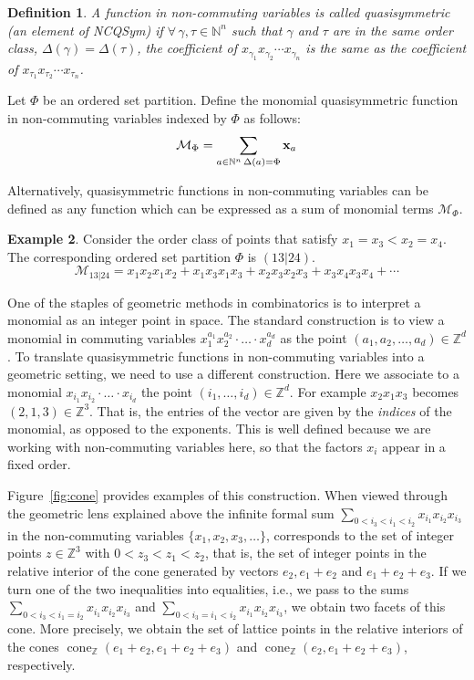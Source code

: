 \documentclass[12pt,reqno]{amsart}
\newtheorem{definition}{Definition}
\numberwithin{definition}{section}
\theoremstyle{definition}
\newtheorem{example}[definition]{Example}
\newcommand{\ZZ}{\mathbb{Z}}
\newcommand{\cone}{\operatorname{cone}}
\newcommand{\ncM}{\mathcal{M}}
\begin{document}
\begin{definition}
A function in non-commuting variables is called quasisymmetric (an element of NCQSym) if
$\forall \, \gamma, \tau \in \mathbb{N}^n$ such that $\gamma$ and $\tau$
are in the same order class, $\Delta(\gamma) =
\Delta(\tau)$, the coefficient of $x_{\gamma_1}x_{\gamma_2} \cdots
x_{\gamma_n}$ is the same as the coefficient of $x_{\tau_1}x_{\tau_2} \cdots x_{\tau_n}$.
\end{definition}

Let $\Phi$ be an ordered set partition.  Define the monomial quasisymmetric function in non-commuting variables indexed by $\Phi$ as follows:
$$\ncM_{\Phi} = \sum_{a \in \mathbb{N}^n \, \Delta(a) = \Phi} {\bf{x}}_{a}$$

Alternatively, quasisymmetric functions in non-commuting variables can be defined as any function which can be expressed as a sum of monomial terms $\ncM_{\Phi}$.

\begin{example}
Consider the order class of points that satisfy $x_1 = x_3 < x_2 =
x_4$.  The corresponding ordered set partition $\Phi$ is $(13|24)$.
$$\ncM_{13|24} = x_1x_2x_1x_2 + x_1x_3x_1x_3 + x_2x_3x_2x_3 + x_3x_4x_3x_4 + \cdots$$  
\end{example}



 One of the staples of geometric methods in combinatorics is to
 interpret a monomial as an integer point in space. The standard
 construction is to view a monomial in commuting variables
 $x_1^{a_1}x_2^{a_2}\cdot\ldots\cdot x_d^{a_d}$ as the point
 $(a_1,a_2,\ldots,a_d)\in\ZZ^d$. To translate quasisymmetric functions
 in non-commuting variables into a geometric setting, we need to use a
 different construction. Here we associate to a monomial
 $x_{i_1} x_{i_2} \cdot \ldots \cdot x_{i_d}$ the point
 $(i_1,\ldots,i_d)\in \ZZ^d$. For example $x_2x_1x_3$ becomes
 $(2,1,3)\in\ZZ^3$. That is, the entries of the vector are given by
 the \emph{indices} of the monomial, as opposed to the exponents. This
 is well defined because we are working with non-commuting variables here, so
 that the factors $x_i$ appear in a fixed order.

Figure~\ref{fig:cone} provides examples of this construction.  When viewed
through the geometric lens explained above the infinite formal sum
$\sum_{0<i_3<i_1<i_2} x_{i_1}x_{i_2}x_{i_3}$ in the non-commuting
variables $\{x_1,x_2,x_3,\ldots\}$, corresponds to the set of integer
points $z\in\ZZ^3$ with $0<z_3<z_1<z_2$, that is, the set of integer
points in the relative interior of the cone generated by vectors
$e_2,e_1+e_2$ and $e_1+e_2+e_3$. If we turn one of the two
inequalities into equalities, i.e., we pass to the sums
$\sum_{0<i_3<i_1 = i_2} x_{i_1}x_{i_2}x_{i_3}$ and
$\sum_{0<i_3=i_1<i_2} x_{i_1}x_{i_2}x_{i_3}$, we obtain two facets of
this cone. More precisely, we obtain the set of lattice points in the
relative interiors of the cones $\cone_\ZZ(e_1+e_2,e_1+e_2+e_3)$ and
$\cone_\ZZ(e_2,e_1+e_2+e_3)$, respectively.
\end{document}
